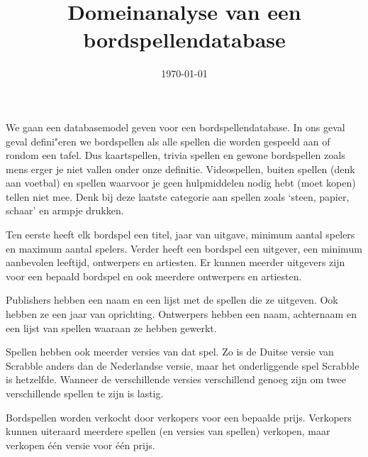 \documentclass[a4paper, dutch, parskip=full]{scrartcl}
\begin{document}
\title{Domeinanalyse van een bordspellendatabase}
\author{}
\date{\today}
\maketitle
We gaan een databasemodel geven voor een bordspellendatabase.
In ons geval geval defini"eren we bordspellen als alle spellen die worden gespeeld aan of rondom een
tafel.
Dus kaartspellen, trivia spellen en gewone bordspellen zoals mens erger je niet vallen onder onze
definitie.
Videospellen, buiten spellen (denk aan voetbal) en spellen waarvoor je geen hulpmiddelen nodig hebt
(moet kopen) tellen niet mee.
Denk bij deze laatste categorie aan spellen zoals `steen, papier, schaar' en armpje drukken.

Ten eerste heeft elk bordspel een titel, jaar van uitgave, minimum aantal spelers en maximum aantal
spelers.
Verder heeft een bordspel een uitgever, een minimum aanbevolen leeftijd, ontwerpers en artiesten.
Er kunnen meerder uitgevers zijn voor een bepaald bordspel en ook meerdere ontwerpers en artiesten.

Publishers hebben een naam en een lijst met de spellen die ze uitgeven.
Ook hebben ze een jaar van oprichting.
Ontwerpers hebben een naam, achternaam en een lijst van spellen waaraan ze hebben gewerkt.

Spellen hebben ook meerder versies van dat spel.
Zo is de Duitse versie van Scrabble anders dan de Nederlandse versie, maar het onderliggende spel
Scrabble is hetzelfde.
Wanneer de verschillende versies verschillend genoeg zijn om twee verschillende spellen te zijn is
lastig.

Bordspellen worden verkocht door verkopers voor een bepaalde prijs.
Verkopers kunnen uiteraard meerdere spellen (en versies van spellen) verkopen, maar verkopen
\'{e}\'{e}n versie voor \'{e}\'{e}n prijs.
\end{document}
